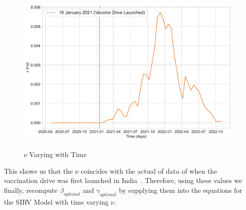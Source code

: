 \documentclass[tikz,fleqn,12pt]{wlscirep}
\begin{document}
\begin{figure}[htbp!]
  \centering
  \caption{$\nu$ Varying with Time}
  \includegraphics[width=\linewidth]{images/interpolated_nu_varying_with_time_IND.pdf}
  \label{fig:interpolated_nu_varying_with_time_IND}
\end{figure}

This shows us that the $\nu$ coincides with the actual of data of when the vaccination drive was first launched in India~\cite{UnicefCovidVaccine,PIBCovidVaccine,WikipediaCovidVaccine}. Therefore, using these values we finally, recompute $\beta_{optimal}$ and $\gamma_{optimal}$ by supplying them into the equations for the SIRV Model with time varying $\nu$.
\end{document}
